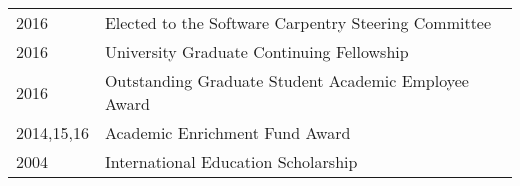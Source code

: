 \documentclass[]{deedy-resume-openfont}
\begin{document}
\begin{minipage}[t]{0.79\textwidth}
\sectionsep
\sectionsep 



\begin{tabular}{ll}
2016 & Elected to the Software Carpentry Steering Committee\\
2016 & University Graduate Continuing Fellowship\\
2016 & Outstanding Graduate Student Academic Employee Award\\
2014,15,16 & Academic Enrichment Fund Award  \\
2004 & International Education Scholarship \\
\end{tabular}
\sectionsep


\end{minipage} 
\end{document}
